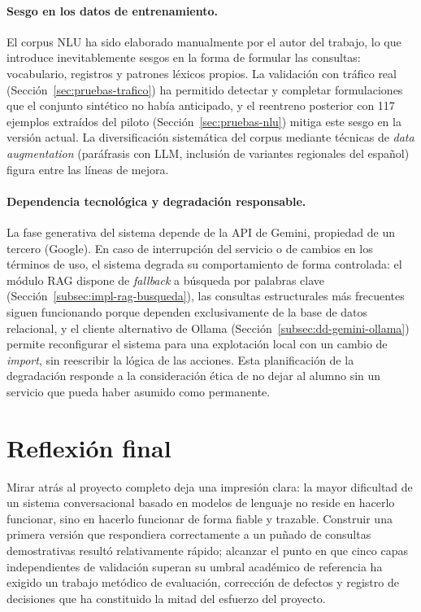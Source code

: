 \paragraph{Sesgo en los datos de entrenamiento.} El corpus NLU ha sido elaborado manualmente por el autor del trabajo, lo que introduce inevitablemente sesgos en la forma de formular las consultas: vocabulario, registros y patrones léxicos propios. La validación con tráfico real (Sección~\ref{sec:pruebas-trafico}) ha permitido detectar y completar formulaciones que el conjunto sintético no había anticipado, y el reentreno posterior con 117 ejemplos extraídos del piloto (Sección~\ref{sec:pruebas-nlu}) mitiga este sesgo en la versión actual. La diversificación sistemática del corpus mediante técnicas de \textit{data augmentation} (paráfrasis con LLM, inclusión de variantes regionales del español) figura entre las líneas de mejora.

\paragraph{Dependencia tecnológica y degradación responsable.} La fase generativa del sistema depende de la API de Gemini, propiedad de un tercero (Google). En caso de interrupción del servicio o de cambios en los términos de uso, el sistema degrada su comportamiento de forma controlada: el módulo RAG dispone de \textit{fallback} a búsqueda por palabras clave (Sección~\ref{subsec:impl-rag-busqueda}), las consultas estructurales más frecuentes siguen funcionando porque dependen exclusivamente de la base de datos relacional, y el cliente alternativo de Ollama (Sección~\ref{subsec:dd-gemini-ollama}) permite reconfigurar el sistema para una explotación local con un cambio de \textit{import}, sin reescribir la lógica de las acciones. Esta planificación de la degradación responde a la consideración ética de no dejar al alumno sin un servicio que pueda haber asumido como permanente.

\section{Reflexión final}\label{sec:conc-reflexion}

Mirar atrás al proyecto completo deja una impresión clara: la mayor dificultad de un sistema conversacional basado en modelos de lenguaje no reside en hacerlo funcionar, sino en hacerlo funcionar de forma fiable y trazable. Construir una primera versión que respondiera correctamente a un puñado de consultas demostrativas resultó relativamente rápido; alcanzar el punto en que cinco capas independientes de validación superan su umbral académico de referencia ha exigido un trabajo metódico de evaluación, corrección de defectos y registro de decisiones que ha constituido la mitad del esfuerzo del proyecto.

